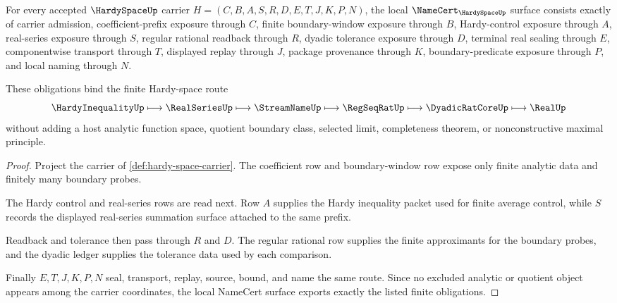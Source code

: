 \begin{theorem}
\label{thm:hardy-space-namecert-obligations}
For every accepted $\HardySpaceUp$ carrier $H=(C,B,A,S,R,D,E,T,J,K,P,N)$, the local $\NameCert_{\HardySpaceUp}$ surface consists exactly of carrier admission, coefficient-prefix exposure through $C$, finite boundary-window exposure through $B$, Hardy-control exposure through $A$, real-series exposure through $S$, regular rational readback through $R$, dyadic tolerance exposure through $D$, terminal real sealing through $E$, componentwise transport through $T$, displayed replay through $J$, package provenance through $K$, boundary-predicate exposure through $P$, and local naming through $N$.

These obligations bind the finite Hardy-space route
$$
\HardyInequalityUp \longmapsto \RealSeriesUp \longmapsto \StreamNameUp \longmapsto \RegSeqRatUp \longmapsto \DyadicRatCoreUp \longmapsto \RealUp
$$
without adding a host analytic function space, quotient boundary class, selected limit, completeness theorem, or nonconstructive maximal principle.
\end{theorem}
\begin{proof}
Project the carrier of \autoref{def:hardy-space-carrier}. The coefficient row and boundary-window row expose only finite analytic data and finitely many boundary probes.

The Hardy control and real-series rows are read next. Row $A$ supplies the Hardy inequality packet used for finite average control, while $S$ records the displayed real-series summation surface attached to the same prefix.

Readback and tolerance then pass through $R$ and $D$. The regular rational row supplies the finite approximants for the boundary probes, and the dyadic ledger supplies the tolerance data used by each comparison.

Finally $E,T,J,K,P,N$ seal, transport, replay, source, bound, and name the same route. Since no excluded analytic or quotient object appears among the carrier coordinates, the local NameCert surface exports exactly the listed finite obligations.
\end{proof}

